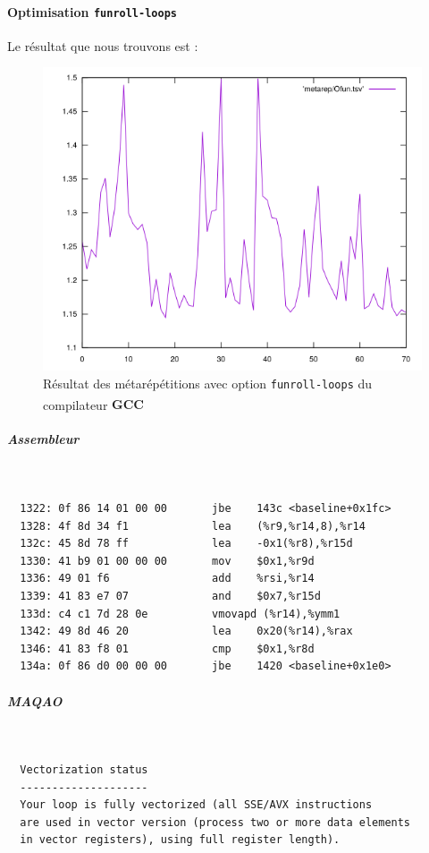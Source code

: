 \documentclass{report}
\begin{document}
	      \paragraph{Optimisation \texttt{funroll-loops}}
        Le résultat que nous trouvons est :
        \begin{figure}[ht!]
          \centering
          \includegraphics[scale=0.45]{resources/L1/metarep/Ofun.png}
          \caption{Résultat des métarépétitions avec option \texttt{funroll-loops} du compilateur \textbf{GCC\textsuperscript \textcopyleft  }}
        \end{figure}
        \subparagraph{Assembleur}\mbox{} \\
          \begin{tcolorbox}
            \begin{verbatim}
  1322:	0f 86 14 01 00 00    	jbe    143c <baseline+0x1fc>
  1328:	4f 8d 34 f1          	lea    (%r9,%r14,8),%r14
  132c:	45 8d 78 ff          	lea    -0x1(%r8),%r15d
  1330:	41 b9 01 00 00 00    	mov    $0x1,%r9d
  1336:	49 01 f6             	add    %rsi,%r14
  1339:	41 83 e7 07          	and    $0x7,%r15d
  133d:	c4 c1 7d 28 0e       	vmovapd (%r14),%ymm1
  1342:	49 8d 46 20          	lea    0x20(%r14),%rax
  1346:	41 83 f8 01          	cmp    $0x1,%r8d
  134a:	0f 86 d0 00 00 00    	jbe    1420 <baseline+0x1e0>
          \end{verbatim}
        \end{tcolorbox}
        \subparagraph{MAQAO}\mbox{} \\
          \begin{tcolorbox}
            \begin{verbatim}
  Vectorization status
  --------------------
  Your loop is fully vectorized (all SSE/AVX instructions
  are used in vector version (process two or more data elements
  in vector registers), using full register length).
          \end{verbatim}
        \end{tcolorbox}
      \newpage
\end{document}
